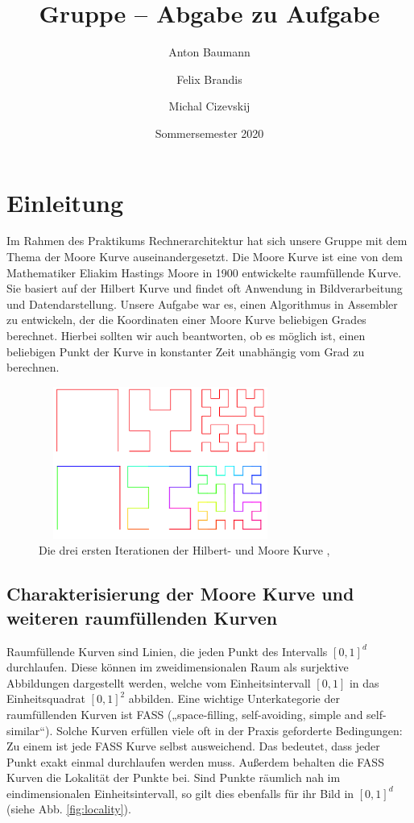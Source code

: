 \documentclass[course=erap]{aspdoc}
\author{Anton Baumann \and Felix Brandis \and Michal Cizevskij}
\date{Sommersemester 2020}
\title{Gruppe \theGroup{} -- Abgabe zu Aufgabe \theNumber}
\begin{document}
\maketitle

\section{Einleitung}
Im Rahmen des Praktikums Rechnerarchitektur hat sich unsere Gruppe mit dem Thema der Moore Kurve auseinandergesetzt. Die Moore Kurve ist eine von dem Mathematiker Eliakim Hastings Moore in 1900 entwickelte raumfüllende Kurve. Sie basiert auf der Hilbert Kurve und findet oft Anwendung in Bildverarbeitung und Datendarstellung. Unsere Aufgabe war es, einen Algorithmus in Assembler zu entwickeln, der die Koordinaten einer Moore Kurve beliebigen Grades berechnet. Hierbei sollten wir auch beantworten, ob es möglich ist, einen beliebigen Punkt der Kurve in konstanter Zeit unabhängig vom Grad zu berechnen.

\begin{figure}[h]
\centering
    \includegraphics[width=8cm, height=5cm]{Moore_and_Hilbert}
    \caption{Die drei ersten Iterationen der Hilbert- und Moore Kurve \cite{pic:hilbert}, \cite{pic:Moore}}
    \label{fig:mooreCurve}
\end{figure}

\subsection{Charakterisierung der Moore Kurve und weiteren raumfüllenden Kurven}
Raumfüllende Kurven sind Linien, die jeden Punkt des Intervalls $[0,1]^d$ durchlaufen. Diese können im zweidimensionalen Raum als surjektive Abbildungen dargestellt werden, welche vom Einheitsintervall $[0,1]$ in das Einheitsquadrat $[0,1]^2$ abbilden. 
\newline
Eine wichtige Unterkategorie der raumfüllenden Kurven ist FASS („space-filling, self-avoiding, simple and self-similar“). Solche Kurven  erfüllen viele oft in der Praxis geforderte Bedingungen: Zu einem ist jede FASS Kurve selbst ausweichend. Das bedeutet, dass jeder Punkt exakt einmal durchlaufen werden muss. Außerdem behalten die FASS Kurven die Lokalität der Punkte bei. Sind Punkte räumlich nah im eindimensionalen Einheitsintervall, so gilt dies ebenfalls für ihr Bild in $[0,1]^d$ (siehe Abb. \ref{fig:locality}). 
\end{document}
